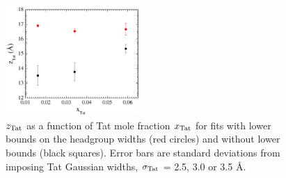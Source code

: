 \begin{figure}[htbp]
  \centering
  \includegraphics[width=0.45\textwidth]{figures/Tat/SDP_Results/zTat_bound}
  \caption[$\zTat$ as a function of Tat mole fraction $\xTat$ for fits with
  lower bounds on the headgroup widths (red circles) and without lower 
  bounds (black squares]
  {$\zTat$ as a function of Tat mole fraction $\xTat$ for fits with
  lower bounds on the headgroup widths (red circles) and without lower 
  bounds (black squares). 
  Error bars are standard deviations from imposing Tat Gaussian widths, 
  $\sigma_\textrm{Tat}$ = 2.5, 3.0 or 3.5 \AA.}
  \label{fig:zTat_bound}
\end{figure}

